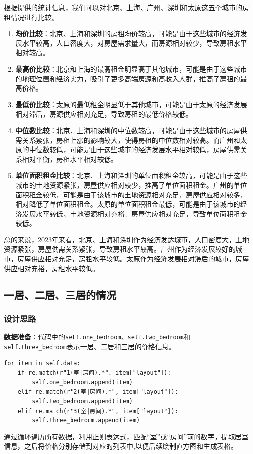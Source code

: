 \documentclass[lang=cn,11pt,a4paper]{elegantpaper}
\begin{document}
根据提供的统计信息，我们可以对北京、上海、广州、深圳和太原这五个城市的房租情况进行比较。

\begin{enumerate}
    \item \textbf{均价比较}：北京、上海和深圳的房租均价较高，可能是由于这些城市的经济发展水平较高，人口密度大，对房屋需求量大，而房源相对较少，导致房租水平相对较高。

    \item \textbf{最高价比较}：北京和上海的最高租金明显高于其他城市，可能是由于这些城市的地理位置和经济实力，吸引了更多高端房源和高收入人群，推高了房租的最高价格。

    \item \textbf{最低价比较}：太原的最低租金明显低于其他城市，可能是由于太原的经济发展相对滞后，房源供应相对充足，导致房租的最低价格较低。

    \item \textbf{中位数比较}：北京、上海和深圳的中位数较高，可能是由于这些城市的房屋供需关系紧张，房租上涨的影响较大，使得房租的中位数相对较高。而广州和太原的中位数较低，可能是由于这些城市的经济发展水平相对较低，房屋供需关系相对平衡，房租水平相对较低。

    \item \textbf{单位面积租金比较}：北京、上海和深圳的单位面积租金较高，可能是由于这些城市的土地资源紧张，房屋供应相对较少，推高了单位面积租金。广州的单位面积租金较低，可能是由于该城市的土地资源相对充足，房屋供应相对较多，相对降低了单位面积租金。太原的单位面积租金最低，可能是由于该城市的经济发展水平较低，土地资源相对充裕，房屋供应相对充足，导致单位面积租金较低。
\end{enumerate}

总的来说，2023年来看，北京、上海和深圳作为经济发达城市，人口密度大，土地资源紧张，房屋供需关系紧张，导致房租水平较高。广州作为经济发展较好的城市，房屋供应相对充足，房租水平较低。太原作为经济发展相对滞后的城市，房屋供应相对充裕，房租水平较低。

\subsection{一居、二居、三居的情况}

\subsubsection{设计思路}

\textbf{数据准备}：代码中的\lstinline{self.one_bedroom}、\lstinline{self.two_bedroom}和\lstinline{self.three_bedroom}表示一居、二居和三居的价格信息。
\begin{lstlisting}
for item in self.data:
    if re.match(r"1(室|房间).*", item["layout"]):
        self.one_bedroom.append(item)
    elif re.match(r"2(室|房间).*", item["layout"]):
        self.two_bedroom.append(item)
    elif re.match(r"3(室|房间).*", item["layout"]):
        self.three_bedroom.append(item)
\end{lstlisting}
通过循环遍历所有数据，利用正则表达式，匹配“室”或“房间”前的数字，提取居室信息，之后将价格分别存储到对应的列表中,以便后续绘制直方图和生成表格。
\end{document}
